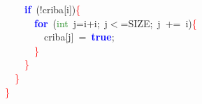 \mbox{}\ \ \ \ \textbf{\textcolor{Blue}{if}}\ \textcolor{BrickRed}{(!}criba\textcolor{BrickRed}{[}i\textcolor{BrickRed}{])}\textcolor{Red}{\{} \\
\mbox{}\ \ \ \ \ \ \textbf{\textcolor{Blue}{for}}\ \textcolor{BrickRed}{(}\textcolor{ForestGreen}{int}\ j\textcolor{BrickRed}{=}i\textcolor{BrickRed}{+}i\textcolor{BrickRed}{;}\ j\textcolor{BrickRed}{$<$=}SIZE\textcolor{BrickRed}{;}\ j\ \textcolor{BrickRed}{+=}\ i\textcolor{BrickRed}{)}\textcolor{Red}{\{} \\
\mbox{}\ \ \ \ \ \ \ \ criba\textcolor{BrickRed}{[}j\textcolor{BrickRed}{]}\ \textcolor{BrickRed}{=}\ \textbf{\textcolor{Blue}{true}}\textcolor{BrickRed}{;} \\
\mbox{}\ \ \ \ \ \ \textcolor{Red}{\}} \\
\mbox{}\ \ \ \ \textcolor{Red}{\}} \\
\mbox{}\ \ \textcolor{Red}{\}} \\
\mbox{}\textcolor{Red}{\}} \\

